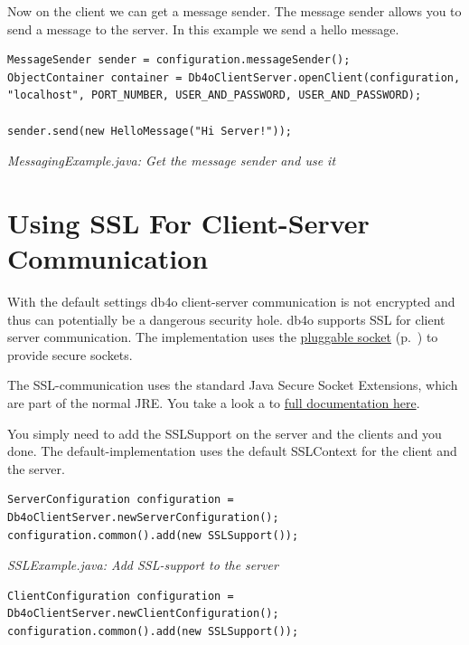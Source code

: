 Now on the client we can get a message sender. The message sender allows you to send a message to the server. In this example we send a hello message.

\begin{lstlisting}
MessageSender sender = configuration.messageSender();
ObjectContainer container = Db4oClientServer.openClient(configuration, "localhost", PORT_NUMBER, USER_AND_PASSWORD, USER_AND_PASSWORD);

sender.send(new HelloMessage("Hi Server!"));
\end{lstlisting}

{\small\itshape MessagingExample.java: Get the message sender and use it\par}
\medskip

\section{Using SSL For Client-Server Communication}
\label{ref:client-server-pluggable-sockets-using-ssl-for-client-server-communication}

With the default settings db4o client-server communication is not encrypted and thus can potentially be a dangerous security hole. db4o supports SSL for client server communication. The implementation uses the \hyperref[ref:configuration-networking-pluggable-sockets]{pluggable socket} (p.~\pageref{ref:configuration-networking-pluggable-sockets}) to provide secure sockets.

The SSL-communication uses the standard Java Secure Socket Extensions, which are part of the normal JRE. You take a look a to \href{https://docs.oracle.com/javase/8/docs/technotes/guides/security/}{full documentation here}.

You simply need to add the SSLSupport on the server and the clients and you done. The default-implementation uses the default SSLContext for the client and the server.

\begin{lstlisting}
ServerConfiguration configuration = Db4oClientServer.newServerConfiguration();
configuration.common().add(new SSLSupport());
\end{lstlisting}

{\small\itshape SSLExample.java: Add SSL-support to the server\par}
\medskip

\begin{lstlisting}
ClientConfiguration configuration = Db4oClientServer.newClientConfiguration();
configuration.common().add(new SSLSupport());
\end{lstlisting}

